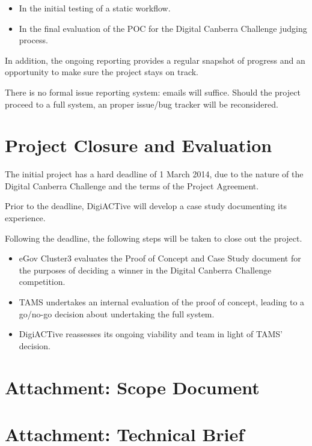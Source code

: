 \documentclass[12pt,a4paper,twosided]{article}
\begin{document}
\begin{itemize}
\itemsep1pt\parskip0pt
\item
  In the initial testing of a static workflow.
\item
  In the final evaluation of the POC for the Digital Canberra Challenge
  judging process.
\end{itemize}

In addition, the ongoing reporting provides a regular snapshot of
progress and an opportunity to make sure the project stays on track.

There is no formal issue reporting system: emails will suffice. Should
the project proceed to a full system, an proper issue/bug tracker will
be reconsidered.

\section{Project Closure and Evaluation}

The initial project has a hard deadline of 1 March 2014, due to the
nature of the Digital Canberra Challenge and the terms of the Project
Agreement.

Prior to the deadline, DigiACTive will develop a case study documenting
its experience.

Following the deadline, the following steps will be taken to close out
the project.

\begin{itemize}
\itemsep1pt\parskip0pt
\item
  eGov Cluster3 evaluates the Proof of Concept and Case Study document
  for the purposes of deciding a winner in the Digital Canberra
  Challenge competition.
\item
  TAMS undertakes an internal evaluation of the proof of concept,
  leading to a go/no-go decision about undertaking the full system.
\item
  DigiACTive reassesses its ongoing viability and team in light of TAMS'
  decision.
\end{itemize}

\section{Attachment: Scope Document}



\section{Attachment: Technical Brief}
\end{document}
